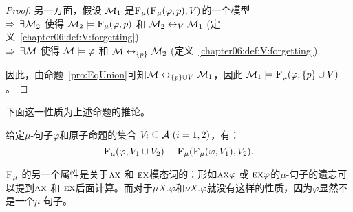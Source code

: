 \begin{proof}
	另一方面，假设 ${\cal M}_1$ 是${\textsc{F}_{\textsc{$\mu$}}}({\textsc{F}_{\textsc{$\mu$}}}(\varphi, p), V)$的一个模型 \\
	$\Rightarrow$ $\exists {\cal M}_2$ 使得 ${\cal M}_2 \models  {\textsc{F}_{\textsc{$\mu$}}}(\varphi, p)$ 和 ${\cal M}_2 \leftrightarrow_V {\cal M}_1$ \hfill(定义~\ref{chapter06:def:V:forgetting})\\
	$\Rightarrow$ $\exists {\cal M}$ 使得 ${\cal M} \models \varphi$ 和 ${\cal M} \leftrightarrow_{\{p\}} {\cal M}_2$ \hfill(定义~\ref{chapter06:def:V:forgetting})
	
	因此，由命题~\ref{pro:EqUnion}可知${\cal M} \leftrightarrow_{\{p\} \cup V} {\cal M}_1$，因此 ${\cal M}_1 \models {\textsc{F}_{\textsc{$\mu$}}}(\varphi, \{p\} \cup V)$。
\end{proof}


下面这一性质为上述命题的推论。

\begin{corollary}[交换性]\label{chapter06:disTFV}
	给定$\mu$-句子$\varphi$和原子命题的集合 $V_i\subseteq{\cal A}~(i=1,2)$，有：
	\[
	{\textsc{F}_{\textsc{$\mu$}}}(\varphi, V_1 \cup V_2) \equiv {\textsc{F}_{\textsc{$\mu$}}}({\textsc{F}_{\textsc{$\mu$}}}(\varphi, V_1), V_2).
	\]
\end{corollary}

${\textsc{F}_{\textsc{$\mu$}}}$ 的另一个属性是关于$\textsc{a}\textsc{x}$ 和 $\textsc{e} \textsc{x}$模态词的：形如$\textsc{a}\textsc{x} \varphi$ 或 $\textsc{e} \textsc{x} \varphi$的$\mu$-句子的遗忘可以提到$\textsc{a}\textsc{x}$ 和 $\textsc{e} \textsc{x}$后面计算。而对于$\mu X. \varphi$和$\nu X. \varphi$就没有这样的性质，因为$\varphi$显然不是一个$\mu$-句子。


